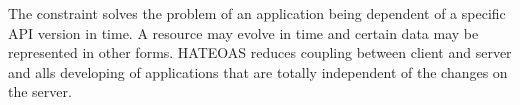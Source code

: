The constraint solves the problem of an application being dependent of a specific API version in time. A resource may evolve in time and certain data may be represented in other forms. HATEOAS reduces coupling between client and server and alls developing of applications that are totally independent of the changes on the server.